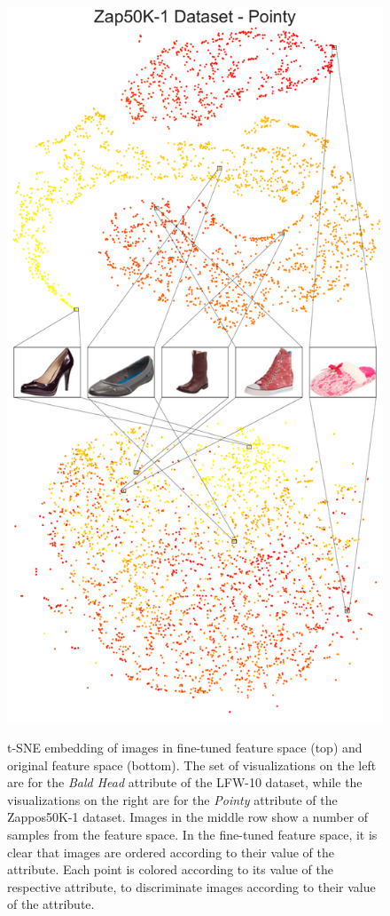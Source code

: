 \begin{figure}
{\includegraphics{zappos-pointy-featspace.pdf}
}
\caption{t-SNE embedding of images in fine-tuned feature space (top) and original feature space (bottom). The set of visualizations on the left are for the \textit{Bald Head} attribute of the LFW-10 dataset, while the visualizations on the right are for the \textit{Pointy} attribute of the Zappos50K-1 dataset. Images in the middle row show a number of samples from the feature space. In the fine-tuned feature space, it is clear that images are ordered according to their value of the attribute. Each point is colored according to its value of the respective attribute, to discriminate images according to their value of the attribute.}
\label{featspace}
\end{figure}


